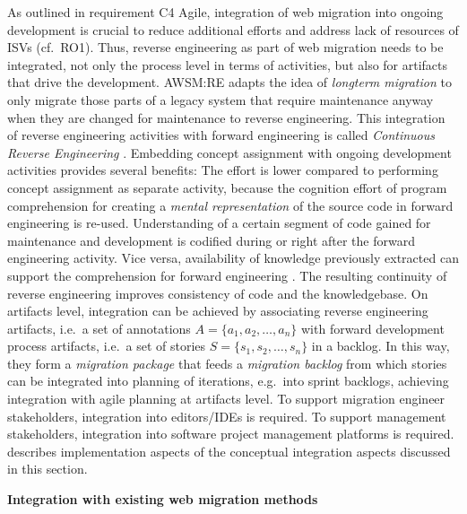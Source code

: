 As outlined in requirement C4 Agile, integration of web migration into ongoing development is crucial to reduce additional efforts and address lack of resources of ISVs (cf.~RO1).
Thus, reverse engineering as part of web migration needs to be integrated, not only the process level in terms of activities, but also for artifacts that drive the development.
AWSM:RE adapts the idea of \emph{longterm migration} \autocite{Borchers1998Longterm} to only migrate those parts of a legacy system that require maintenance anyway when they are changed for maintenance to reverse engineering.
This integration of reverse engineering activities with forward engineering is called \emph{Continuous Reverse Engineering} \autocite{Canfora2007ReverseEngineering}.
Embedding concept assignment with ongoing development activities provides several benefits: The effort is lower compared to performing concept assignment as separate activity, because the cognition effort of program comprehension \autocite{Tilley1996ProgramUnderstanding} for creating a \emph{mental representation} of the source code \autocite{Pennington1987Mental} in forward engineering is re-used.
Understanding of a certain segment of code gained for maintenance and development is codified during or right after the forward engineering activity.
Vice versa, availability of knowledge previously extracted can support the comprehension for forward engineering \autocite{Canfora2007ReverseEngineering}.
The resulting continuity of reverse engineering improves consistency of code and the knowledgebase.
On artifacts level, integration can be achieved by associating reverse engineering artifacts, i.e.~a set of annotations \(A=\{a_1, a_2, \ldots, a_n\}\) with forward development process artifacts, i.e.~a set of stories \(S = \{s_1, s_2, \ldots, s_n\}\) in a backlog.
In this way, they form a \emph{migration package} \autocite{Heil2016AWSM,Gipp2007ReMiP,Zillmann2011SOAMIG} that feeds a \emph{migration backlog} \autocite{Heil2016AWSM} from which stories can be integrated into planning of iterations, e.g.~into sprint backlogs, achieving integration with agile planning at artifacts level.
To support migration engineer stakeholders, integration into editors/IDEs is required.
To support management stakeholders, integration into software project management platforms is required.
 describes implementation aspects of the conceptual integration aspects discussed in this section.

\textbf{Integration with existing web migration methods}

